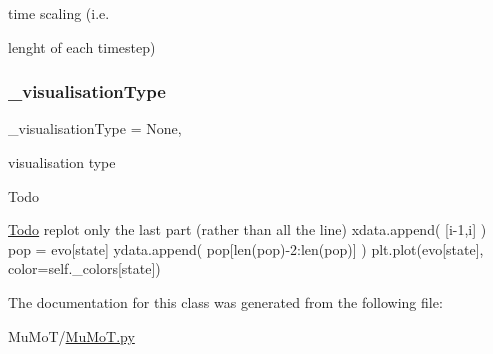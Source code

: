 time scaling (i.\+e. 

lenght of each timestep) \mbox{\label{class_mu_mo_t_1_1_mu_mo_t_1_1_mu_mo_tmultiagent_view_ae8c8d7969b8ab8f31df9d1d1d10eabb9}} 
\subsubsection{\texorpdfstring{\+\_\+visualisation\+Type}{\_visualisationType}}
{\footnotesize\ttfamily \+\_\+visualisation\+Type = None\hspace{0.3cm}{\ttfamily [static]}, {\ttfamily [private]}}



visualisation type 

\begin{DoxyRefDesc}{Todo}
\item[\hyperlink{todo__todo000061}{Todo}]replot only the last part (rather than all the line) xdata.\+append( \mbox{[}i-\/1,i\mbox{]} ) pop = evo\mbox{[}state\mbox{]} ydata.\+append( pop\mbox{[}len(pop)-\/2\+:len(pop)\mbox{]} ) plt.\+plot(evo\mbox{[}state\mbox{]}, color=self.\+\_\+colors\mbox{[}state\mbox{]}) \end{DoxyRefDesc}


The documentation for this class was generated from the following file\+:\begin{DoxyCompactItemize}
\item 
Mu\+Mo\+T/\hyperlink{_mu_mo_t_8py}{Mu\+Mo\+T.\+py}\end{DoxyCompactItemize}
